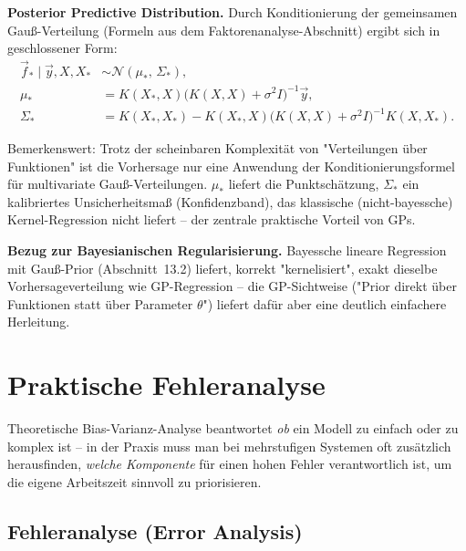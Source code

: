 \documentclass[11pt]{article}
\theoremstyle{csthm}
\theoremstyle{csdef}
\newcommand{\N}{\mathcal{N}}
\begin{document}
\begin{tcolorbox}[thmstyle]
\textbf{Posterior Predictive Distribution.} Durch Konditionierung der
gemeinsamen Gauß-Verteilung (Formeln aus dem Faktorenanalyse-Abschnitt)
ergibt sich in geschlossener Form:
\begin{align}
  \vec f_* \mid \vec y, X, X_* &\sim \N(\mu_*,\,\Sigma_*), \\
  \mu_* &= K(X_*,X)\bigl(K(X,X)+\sigma^2 I\bigr)^{-1}\vec y, \\
  \Sigma_* &= K(X_*,X_*) - K(X_*,X)\bigl(K(X,X)+\sigma^2 I\bigr)^{-1}K(X,X_*).
\end{align}
\end{tcolorbox}

Bemerkenswert: Trotz der scheinbaren Komplexität von "Verteilungen über
Funktionen" ist die Vorhersage nur eine Anwendung der
Konditionierungsformel für multivariate Gauß-Verteilungen. $\mu_*$ liefert
die Punktschätzung, $\Sigma_*$ ein kalibriertes Unsicherheitsmaß
(Konfidenzband), das klassische (nicht-bayessche) Kernel-Regression nicht
liefert -- der zentrale praktische Vorteil von GPs.

\begin{tcolorbox}[defstyle]
\textbf{Bezug zur Bayesianischen Regularisierung.} Bayessche lineare
Regression mit Gauß-Prior (Abschnitt~13.2) liefert, korrekt "kernelisiert",
exakt dieselbe Vorhersageverteilung wie GP-Regression -- die GP-Sichtweise
("Prior direkt über Funktionen statt über Parameter $\theta$") liefert dafür
aber eine deutlich einfachere Herleitung.
\end{tcolorbox}

\section{Praktische Fehleranalyse}

Theoretische Bias-Varianz-Analyse beantwortet \emph{ob} ein Modell zu einfach
oder zu komplex ist -- in der Praxis muss man bei mehrstufigen Systemen oft
zusätzlich herausfinden, \emph{welche Komponente} für einen hohen Fehler
verantwortlich ist, um die eigene Arbeitszeit sinnvoll zu priorisieren.

\subsection{Fehleranalyse (Error Analysis)}
\end{document}
